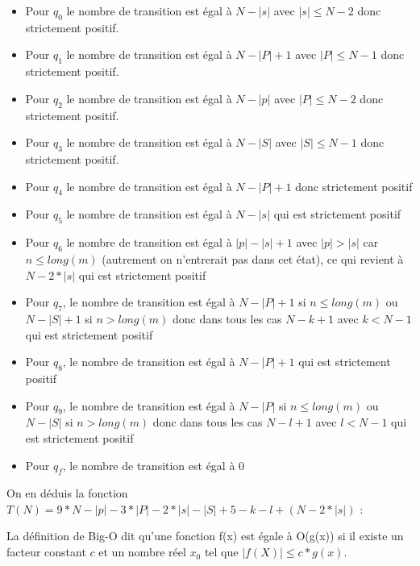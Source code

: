\begin{itemize}
\item Pour $q_0$ le nombre de transition est égal à $N - |s|$ avec $|s| \leq N - 2$ donc strictement positif.
\item Pour $q_1$ le nombre de transition est égal à $N - |P| + 1$ avec $|P| \leq N - 1$ donc strictement positif.
\item Pour $q_2$ le nombre de transition est égal à $N - |p|$ avec $|P| \leq N - 2$ donc strictement positif.
\item Pour $q_3$ le nombre de transition est égal à $N - |S|$ avec $|S| \leq N - 1$ donc strictement positif.
\item Pour $q_4$ le nombre de transition est égal à $N - |P| + 1$ donc strictement positif
\item Pour $q_5$ le nombre de transition est égal à $N - |s|$ qui est strictement positif
\item Pour $q_6$ le nombre de transition est égal à $|p| - |s| + 1$ avec $|p| > |s|$ car $n \leq long(m)$ (autrement on n'entrerait pas dans cet état), ce qui revient à $N - 2 * |s|$ qui est strictement positif
\item Pour $q_7$, le nombre de transition est égal à $N - |P| + 1$ si $n \leq long(m)$ ou $N - |S| + 1$ si $n > long(m)$ donc dans tous les cas $N - k + 1$ avec $k < N - 1$ qui est strictement positif
\item Pour $q_8$, le nombre de transition est égal à $N - |P| + 1$ qui est strictement positif
\item Pour $q_9$, le nombre de transition est égal à $N - |P|$ si $n \leq long(m)$ ou $N - |S|$ si $n > long(m)$ donc dans tous les cas $N - l + 1$ avec $l < N - 1$ qui est strictement positif
\item Pour $q_f$, le nombre de transition est égal à $0$
\end{itemize}

\vspace{5mm}

On en déduis la fonction $T(N) = 9 * N - |p| - 3 * |P| - 2 * |s| - |S| + 5 - k - l + (N - 2 * |s|)$ :

\vspace{5mm}

La définition de Big-O dit qu'une fonction f(x) est égale à O(g(x)) si il existe un facteur constant $c$ et un nombre réel $x_0$ tel que $|f(X)| \leq c * g(x)$.

\vspace{5mm}

